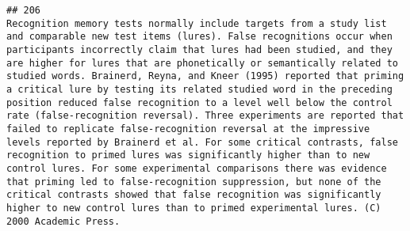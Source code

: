 \documentclass[
  english,
  man]{apa6}
\begin{document}
\begin{verbatim}
## 206                                                                                                                                                                                                                                                                                                                                                                                                                                                                                                                                                                                                                                                                                                                                                                                                                                                                                                                                                                                                                                                                                                                                                                                                                                                                                                                                                                                                                                                                                                                                                                                    Recognition memory tests normally include targets from a study list and comparable new test items (lures). False recognitions occur when participants incorrectly claim that lures had been studied, and they are higher for lures that are phonetically or semantically related to studied words. Brainerd, Reyna, and Kneer (1995) reported that priming a critical lure by testing its related studied word in the preceding position reduced false recognition to a level well below the control rate (false-recognition reversal). Three experiments are reported that failed to replicate false-recognition reversal at the impressive levels reported by Brainerd et al. For some critical contrasts, false recognition to primed lures was significantly higher than to new control lures. For some experimental comparisons there was evidence that priming led to false-recognition suppression, but none of the critical contrasts showed that false recognition was significantly higher to new control lures than to primed experimental lures. (C) 2000 Academic Press.

\end{verbatim}
\end{document}
